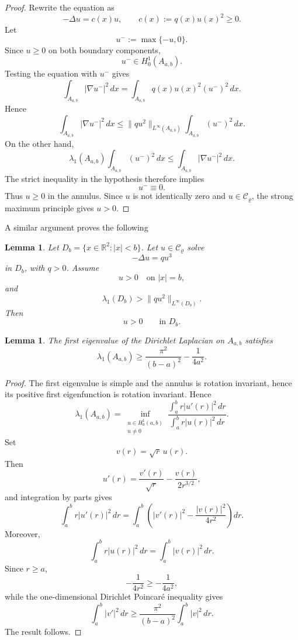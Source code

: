 \documentclass[11pt,a4paper]{amsart}
\newtheorem{lemma}[theorem]{Lemma}
\begin{document}
\begin{proof}
	Rewrite the equation as
	\[
	-\Delta u=c(x)u,
	\qquad
	c(x):=q(x)u(x)^2\ge0.
	\]
	Let
	\[
	u^-:=\max\{-u,0\}.
	\]
	Since $u\ge0$ on both boundary components,
	\[
	u^-\in H_0^1(A_{a,b}).
	\]
	Testing the equation with $u^-$ gives
	\[
	\int_{A_{a,b}}|\nabla u^-|^2\,dx
	=
	\int_{A_{a,b}}
	q(x)u(x)^2(u^-)^2\,dx.
	\]
	Hence
	\[
	\int_{A_{a,b}}|\nabla u^-|^2\,dx
	\le
	\|qu^2\|_{L^\infty(A_{a,b})}
	\int_{A_{a,b}}(u^-)^2\,dx.
	\]
	On the other hand,
	\[
	\lambda_1(A_{a,b})
	\int_{A_{a,b}}(u^-)^2\,dx
	\le
	\int_{A_{a,b}}|\nabla u^-|^2\,dx.
	\]
	The strict inequality in the hypothesis therefore implies
	\[
	u^-\equiv0.
	\]
	Thus $u\ge0$ in the annulus. Since $u$ is not identically zero and $u\in\mathcal C_\varrho$, the	strong maximum principle gives $u>0$.
\end{proof}
A similar argument proves the following

\begin{lemma}\label{lem:disk}Let $D_b=\{x\in\mathbb R^2:|x|<b\}$.
	Let $u\in\mathcal C_\varrho$ solve
	\[
	-\Delta u=qu^3
	\]
	in $D_b$, with $q>0$. Assume
	\[
	u>0
	\quad\text{on }|x|=b,
	\]
	and
	\[
	\lambda_1(D_b)>	\|qu^2\|_{L^\infty(D_b)}.
	\]
	Then
	\[
	u>0	\qquad	\text{in }D_b.
	\]
\end{lemma}

\begin{lemma}\label{lem:firstEVb}
	The first eigenvalue of the Dirichlet Laplacian on $A_{a,b}$ satisfies
	\[
	\lambda_1(A_{a,b})
	\ge
	\frac{\pi^2}{(b-a)^2}
	-
	\frac1{4a^2}.
	\]
\end{lemma}

\begin{proof}
The first eigenvalue is simple and the annulus is rotation invariant, hence its positive first eigenfunction is rotation invariant. Hence
	\[
	\lambda_1(A_{a,b})
	=
	\inf_{\substack{u\in H_0^1(a,b)\\u\ne0}}
	\frac{
		\displaystyle
		\int_a^b r|u'(r)|^2\,dr
	}{
		\displaystyle
		\int_a^b r|u(r)|^2\,dr
	}.
	\]
	Set
	\[
	v(r)=\sqrt r\,u(r).
	\]
	Then
	\[
	u'(r)
	=
	\frac{v'(r)}{\sqrt r}
	-
	\frac{v(r)}{2r^{3/2}},
	\]
	and integration by parts gives
	\[
	\int_a^b r|u'(r)|^2\,dr
	=
	\int_a^b
	\left(
	|v'(r)|^2
	-
	\frac{|v(r)|^2}{4r^2}
	\right)dr.
	\]
	Moreover,
	\[
	\int_a^b r|u(r)|^2\,dr
	=
	\int_a^b|v(r)|^2\,dr.
	\]
	Since $r\ge a$,
	\[
	-\frac1{4r^2}
	\ge
	-\frac1{4a^2},
	\]
	while the one-dimensional Dirichlet Poincar\'e inequality gives
	\[
	\int_a^b|v'|^2\,dr
	\ge
	\frac{\pi^2}{(b-a)^2}
	\int_a^b|v|^2\,dr.
	\]
	The result follows.
\end{proof}
\end{document}
